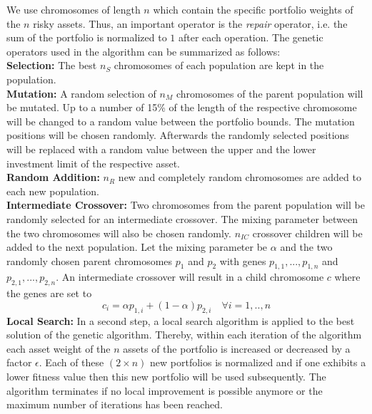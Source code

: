 {\hspace{-0.5em}We use chromosomes of length $n$ which contain the specific portfolio weights of the $n$ risky assets. Thus, an important operator is the \textit{repair} operator, i.e. the sum of the portfolio is normalized to $1$ after each operation. The genetic operators used in the algorithm can be summarized as follows:\\[1\baselineskip]
\textbf{Selection: }The best $n_S$ chromosomes of each population are kept in the population.\\[1\baselineskip]
\textbf{Mutation: }A random selection of $n_M$ chromosomes of the parent population will be mutated. Up to a number of 15\% of the length of the respective chromosome will be changed to a random
value between the portfolio bounds. The mutation positions will be chosen randomly. Afterwards the randomly selected positions will be replaced with a random value between the upper and the lower investment limit of the respective asset.\\[1\baselineskip]
\textbf{Random Addition: }$n_R$ new and completely random chromosomes are added to each new population.\\[1\baselineskip]
\textbf{Intermediate Crossover: }Two chromosomes from the parent population will be randomly selected for an intermediate crossover. The mixing parameter between the two chromosomes will also be chosen randomly. $n_{IC}$ crossover children will be added to the next population. Let the mixing parameter be $\alpha$ and the two randomly chosen parent chromosomes $p_1$ and $p_2$ with genes $p_{1,1},...,p_{1,n}$ and $p_{2,1},...,p_{2,n}$. An intermediate crossover will result in a child chromosome $c$ where the genes are set to
\begin{equation}
c_i = \alpha p_{1,i} + (1-\alpha)p_{2,i} \hspace{1em} \forall i=1,..,n
\end{equation}
\textbf{Local Search: }In a second step, a local search algorithm is applied to the best solution of the genetic algorithm. Thereby, within each iteration of the algorithm each asset weight of the $n$ assets of the portfolio is increased or decreased by a factor $\epsilon$. Each of these $(2\times n)$ new portfolios is normalized and if one exhibits a lower fitness value then this new portfolio will be used subsequently. The algorithm terminates if no local improvement is possible anymore or the maximum number of iterations
has been reached.

}
